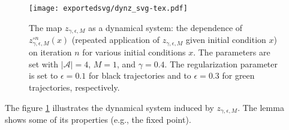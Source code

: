 \begin{figure}
    \centering
    \texttt{[image: exportedsvg/dynz\_svg-tex.pdf]}
    \caption{The map $z_{\gamma,\epsilon,M}$ as a dynamical system:
    the dependence of $z_{\gamma,\epsilon,M}^{\circ n}(x)$ (repeated application of $z_{\gamma,\epsilon,M}$ given initial condition $x$) on iteration $n$ for various
    initial conditions $x$. The parameters are set with 
    $|\mathcal{A}| = 4$, $M = 1$, and $\gamma = 0.4$. The regularization parameter is set to  $\epsilon = 0.1$ for black trajectories
    and to $\epsilon = 0.3$ for green trajectories, respectively.    
}
    \label{fig:z}
\end{figure}
The figure \ref{fig:z} illustrates the dynamical system induced by $z_{\gamma,\epsilon,M}$.
The lemma shows some of its properties (e.g., the fixed point). 

